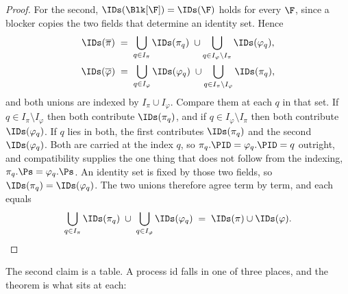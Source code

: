 \documentclass[10pt,oneside,openany]{book}
\theoremstyle{accentdef}
\theoremstyle{accentplain}
\begin{document}
\begin{proof}
For the second, $\IDs(\Blk[\F]) = \IDs(\F)$ holds for every $\F$, since a blocker copies the
two fields that determine an identity set. Hence
\[
  \begin{gathered}
  \IDs(\overline{\pi}) \;=\; \bigcup_{q \in I_\pi} \IDs(\pi_q) \;\cup \bigcup_{q \in I_\varphi \setminus I_\pi} \IDs(\varphi_q), \\
  \IDs(\overline{\varphi}) \;=\; \bigcup_{q \in I_\varphi} \IDs(\varphi_q) \;\cup \bigcup_{q \in I_\pi \setminus I_\varphi} \IDs(\pi_q),
  \end{gathered}
\]
and both unions are indexed by $I_\pi \cup I_\varphi$. Compare them at each $q$ in that set. If
$q \in I_\pi \setminus I_\varphi$ then both contribute $\IDs(\pi_q)$, and if $q \in I_\varphi \setminus I_\pi$
then both contribute $\IDs(\varphi_q)$. If $q$ lies in both, the first contributes
$\IDs(\pi_q)$ and the second $\IDs(\varphi_q)$. Both are carried at the index $q$, so
$\pi_q.\PID = \varphi_q.\PID = q$ outright, and compatibility supplies the one thing that does not
follow from the indexing, $\pi_q.\Ps = \varphi_q.\Ps$. An identity set is fixed by those two
fields, so $\IDs(\pi_q) = \IDs(\varphi_q)$. The two unions therefore agree term by
term, and each equals
\[
  \bigcup_{q \in I_\pi} \IDs(\pi_q) \;\cup\; \bigcup_{q \in I_\varphi} \IDs(\varphi_q)
  \;=\; \IDs(\pi) \cup \IDs(\varphi) .
\]
\end{proof}

The second claim is a table. A process id falls in one of three places, and the theorem is what
sits at each:
\end{document}
